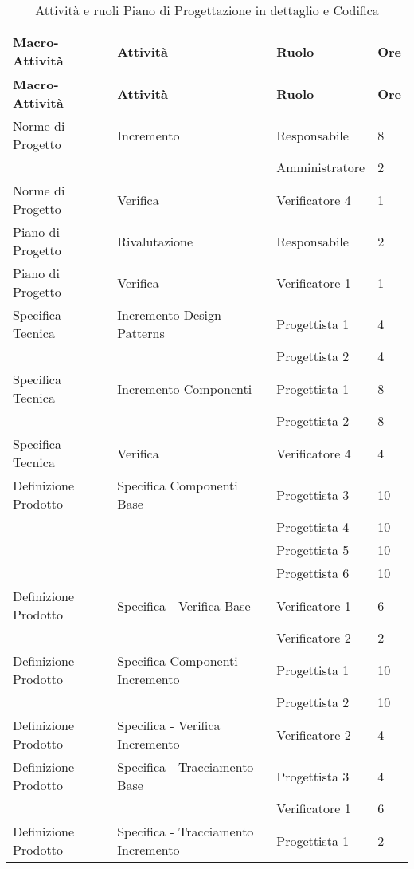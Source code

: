 {{	\begin{longtable} [c]{| l | l | l | l |}
		\caption{Attivit\`{a} e ruoli Piano di Progettazione in dettaglio e Codifica \label{tab:pianoprogettazdettcodifica}}\\
		 \hline
		 \textbf{Macro-Attivit\`{a}} & \textbf{Attivit\`{a}} & \textbf{Ruolo} & \textbf{Ore}\\
		 \hline
		 \endfirsthead
		 \hline
		 \textbf{Macro-Attivit\`{a}} & \textbf{Attivit\`{a}} & \textbf{Ruolo} & \textbf{Ore}\\
		 \hline
				\endhead
		 \hline
		 \endfoot
		 \hline
		 \endlastfoot
		 Norme di Progetto & Incremento & Responsabile & 8\\
		 &	&	Amministratore & 2\\
		 Norme di Progetto & Verifica & Verificatore 4 & 1 \\
		 Piano di Progetto & Rivalutazione & Responsabile & 2 \\
		 Piano di Progetto & Verifica & Verificatore 1 & 1 \\
		 Specifica Tecnica & Incremento Design Patterns & Progettista 1 & 4\\
		 &	&	Progettista 2 & 4\\
		 Specifica Tecnica & Incremento Componenti & Progettista 1 & 8\\
		 &	&	Progettista 2 & 8\\
		 Specifica Tecnica & Verifica & Verificatore 4 & 4 \\
		 Definizione Prodotto & Specifica Componenti Base & Progettista 3 & 10\\
		 &	&	Progettista 4 & 10\\
		 &	&	Progettista 5 & 10\\
		 &	&	Progettista 6 & 10\\
		 Definizione Prodotto & Specifica - Verifica Base & Verificatore 1 & 6\\
		 &	&	Verificatore 2 & 2\\
		 Definizione Prodotto & Specifica Componenti Incremento & Progettista 1 & 10\\
		 &	&	Progettista 2 & 10\\
		 Definizione Prodotto & Specifica - Verifica Incremento & Verificatore 2 & 4 \\
		 Definizione Prodotto & Specifica - Tracciamento Base & Progettista 3 & 4\\
		 &	&	Verificatore 1 & 6\\
		 Definizione Prodotto & Specifica - Tracciamento Incremento & Progettista 1 & 2\\

\end{longtable}}}
